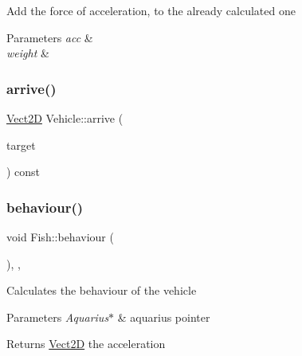 Add the force of acceleration, to the already calculated one 
\begin{DoxyParams}{Parameters}
{\em acc} & \\
\hline
{\em weight} & \\
\hline
\end{DoxyParams}
\mbox{\label{classVehicle_a55f8bb6cfbdd97219c2cea6cf3ad3826_a55f8bb6cfbdd97219c2cea6cf3ad3826}} 
\subsubsection{\texorpdfstring{arrive()}{arrive()}}
{\footnotesize\ttfamily \hyperlink{classVect2D}{Vect2D} Vehicle\+::arrive (\begin{DoxyParamCaption}\item[{const \hyperlink{classVect2D}{Vect2D} \&}]{target }\end{DoxyParamCaption}) const\hspace{0.3cm}{\ttfamily [inherited]}}

\mbox{\label{classFish_abffd423bc7a7730aafa80ec9c0cec9a0_abffd423bc7a7730aafa80ec9c0cec9a0}} 
\subsubsection{\texorpdfstring{behaviour()}{behaviour()}}
{\footnotesize\ttfamily void Fish\+::behaviour (\begin{DoxyParamCaption}\item[{\hyperlink{classAquarius}{Aquarius} $\ast$}]{ }\end{DoxyParamCaption})\hspace{0.3cm}{\ttfamily [override]}, {\ttfamily [protected]}, {\ttfamily [virtual]}}

Calculates the behaviour of the vehicle 
\begin{DoxyParams}{Parameters}
{\em Aquarius$\ast$} & aquarius pointer \\
\hline
\end{DoxyParams}
\begin{DoxyReturn}{Returns}
\hyperlink{classVect2D}{Vect2D} the acceleration 
\end{DoxyReturn}


